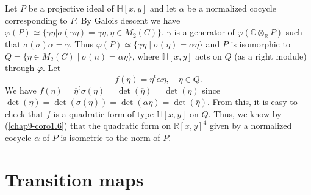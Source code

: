 Let $P$ be a projective ideal of $\mathbb{H}[x,y]$ and let $\alpha$ be
a normalized cocycle corresponding to $P$. By Galois descent we have
$\varphi(P)\simeq \{\gamma \eta|\sigma(\gamma\eta)=\gamma\eta,\eta\in
M_{2}(C)\}$. $\gamma$ is a generator of
$\varphi(\mathbb{C}\otimes_{\mathbb{R}}P)$ such that
$\sigma(\sigma)\alpha=\gamma$. Thus
$\varphi(P)\simeq \{\gamma\eta\mid\sigma(\eta)=\alpha\eta\}$ and $P$
is isomorphic to $Q=\{\eta\in M_{2}(C)\mid\sigma(n)=\alpha\eta\}$,
where $\mathbb{H}[x,y]$ acts on $Q$ (as a right module) through
$\varphi$. Let
$$
f(\eta)=\overline{\eta}^{t}\alpha\eta,\quad \eta\in Q.
$$
We have
$f(\eta)=\overline{\eta}^{t}\sigma(\eta)=\det(\overline{\eta})=\det(\eta)$
since
$\det(\eta)=\det(\sigma(\eta))=\det(\alpha\eta)=\det(\bar{\eta})$. From
this, it is easy to check that $f$ is a quadratic form of type
$\mathbb{H}[x,y]$ on $Q$. Thus, we know by (\ref{chap9-coro1.6}) that
the quadratic form on $\mathbb{R}[x,y]^{4}$ given by a normalized
cocycle $\alpha$ of $P$ is isometric to the norm of $P$. 

\section{Transition maps}\label{chap9-sec6}

\subsection{}\label{chap9-sec6.1}


